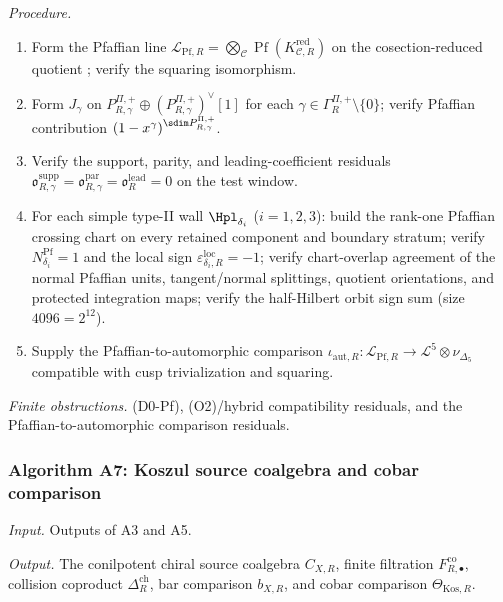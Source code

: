 \textit{Procedure.}
\begin{enumerate}
\item Form the Pfaffian line
$\mathscr L_{\mathrm{Pf},R}=\bigotimes_{\mathcal C}
\operatorname{Pf}(K^{\mathrm{red}}_{\mathcal C,R})$ on the
cosection-reduced quotient \cite{BBDJS2015}; verify the squaring
isomorphism.
\item Form $J_\gamma$ on
$P^{\Pi,+}_{R,\gamma}\oplus(P^{\Pi,+}_{R,\gamma})^\vee[1]$ for each
$\gamma\in\Gamma_R^{\Pi,+}\setminus\{0\}$; verify Pfaffian
contribution $(1-x^\gamma)^{\sdim P^{\Pi,+}_{R,\gamma}}$.
\item Verify the support, parity, and leading-coefficient residuals
$\mathfrak o^{\mathrm{supp}}_{R,\gamma}=
\mathfrak o^{\mathrm{par}}_{R,\gamma}=
\mathfrak o^{\mathrm{lead}}_R=0$ on the test window.
\item For each simple type-II wall $\Hpl_{\delta_i}$ ($i=1,2,3$):
build the rank-one Pfaffian crossing chart on every retained
component and boundary stratum; verify
$N_{\delta_i}^{\mathrm{Pf}}=1$ and the local sign
$\varepsilon^{\mathrm{loc}}_{\delta_i,R}=-1$; verify chart-overlap
agreement of the normal Pfaffian units, tangent/normal splittings,
quotient orientations, and protected integration maps; verify the
half-Hilbert orbit sign sum (size $4096=2^{12}$).
\item Supply the Pfaffian-to-automorphic comparison
$\iota_{\mathrm{aut},R}:\mathscr L_{\mathrm{Pf},R}\to\mathcal L^5
\otimes\nu_{\Delta_5}$ compatible with cusp trivialization and
squaring.
\end{enumerate}

\textit{Finite obstructions.}  (D0-Pf), (O2)/hybrid compatibility
residuals, and the Pfaffian-to-automorphic comparison residuals.

\subsubsection*{Algorithm A7: Koszul source coalgebra and cobar
comparison}

\textit{Input.} Outputs of A3 and A5.

\textit{Output.} The conilpotent chiral source coalgebra $C_{X,R}$,
finite filtration $F^{\mathrm{co}}_{R,\bullet}$, collision coproduct
$\Delta_R^{\mathrm{ch}}$, bar comparison $b_{X,R}$, and cobar
comparison $\Theta_{\mathrm{Kos},R}$.

